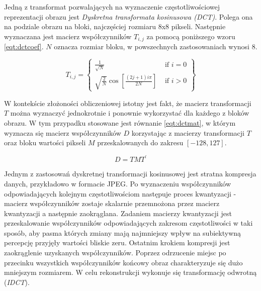 {{{            %
            Jedną z transformat pozwalających na wyznaczenie częstotliwościowej reprezentacji obrazu jest
            \textit{Dyskretna transformata kosinusowa (DCT)}\cite{ImageCompressionDCT}. Polega ona na podziale obrazu na
            bloki, najczęściej rozmiaru 8x8 pikseli. Następnie wyznaczana jest macierz współczynników $T_{i, j}$ za
            pomocą poniższego wzoru \ref{eqt:dctcoef}. $N$ oznacza rozmiar bloku, w powszechnych zastosowaniach wynosi
            8.

            \begin{equation}\label{eqt:dctcoef}
                T_{i, j}=\left\{\begin{array}{ll}\frac{1}{\sqrt{N}} & \text { if } i=0 \\ \sqrt{\frac{2}{N}} \cos \left[\frac{(2 j+1) i \pi}{2 N}\right] & \text { if } i>0\end{array}\right\}
            \end{equation}
            
            W kontekście złożoności obliczeniowej istotny jest fakt, że macierz transformacji $T$ można wyznaczyć
            jednokrotnie i ponownie wykorzystać dla każdego z bloków obrazu. W tym przypadku stosowane jest równanie
            \ref{eqt:dctmat}, w którym wyznacza się macierz współczynników $D$ korzystając z macierzy transformacji $T$
            oraz bloku wartości pikseli $M$ przeskalowanych do zakresu $[-128, 127]$.
            
            \begin{equation}\label{eqt:dctmat}
                D=T M T^{\prime}
            \end{equation}
            
            Jednym z zastosowań dyskretnej transformacji kosinusowej jest stratna kompresja danych, przykładowo w
            formacie JPEG. Po wyznaczeniu współczynników odpowiadających kolejnym częstotliwościom następuje proces
            kwantyzacji - macierz współczynników zostaje skalarnie przemnożona przez macierz kwantyzacji a następnie
            zaokrąglana. Zadaniem macierzy kwantyzacji jest przeskalowanie współczynników odpowiadających zakresom
            częstotliwości w taki sposób, aby pasma których zmiany mają najmniejszy wpływ na subiektywną percepcję
            przyjęły wartości bliskie zeru. Ostatnim krokiem kompresji jest zaokrąglenie uzyskanych współczynników.
            Poprzez odrzucenie miejsc po przecinku wszystkich współczynników końcowy obraz charakteryzuje się dużo
            mniejszym rozmiarem. W celu rekonstrukcji wykonuje się transformację odwrotną (\textit{IDCT}).

}}}
